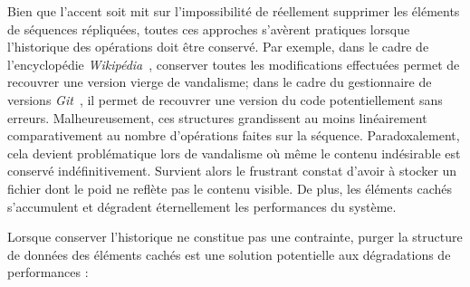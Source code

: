 Bien que l'accent soit mit sur l'impossibilité de réellement supprimer les
éléments de séquences répliquées, toutes ces approches s'avèrent pratiques
lorsque l'historique des opérations doit être conservé. Par exemple, dans le
cadre de l'encyclopédie \emph{Wikipédia}~\cite{wikipedia}, conserver toutes les
modifications effectuées permet de recouvrer une version vierge de vandalisme;
dans le cadre du gestionnaire de versions \emph{Git}~\cite{git}, il permet de
recouvrer une version du code potentiellement sans erreurs. Malheureusement, ces
structures grandissent au moins linéairement comparativement au nombre
d'opérations faites sur la séquence. Paradoxalement, cela devient problématique
lors de vandalisme où même le contenu indésirable est conservé
indéfinitivement. Survient alors le frustrant constat d'avoir à stocker un
fichier dont le poid ne reflète pas le contenu visible. De plus, les éléments
cachés s'accumulent et dégradent éternellement les performances du système.

Lorsque conserver l'historique ne constitue pas une contrainte, purger la
structure de données des éléments cachés est une solution potentielle aux
dégradations de performances :


